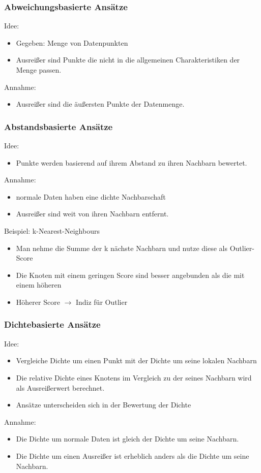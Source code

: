 \documentclass{article} %
\begin{document}
\subsubsection{Abweichungsbasierte Ansätze}
Idee:
\begin{itemize}
	\item Gegeben: Menge von Datenpunkten
    \item Ausreißer sind Punkte die nicht in die allgemeinen Charakteristiken der Menge passen.
\end{itemize}
Annahme:
\begin{itemize}
	\item Ausreißer sind die äußersten Punkte der Datenmenge.
\end{itemize}
\subsubsection{Abstandsbasierte Ansätze}
Idee:
\begin{itemize}
	\item Punkte werden basierend auf ihrem Abstand zu ihren Nachbarn bewertet. 
\end{itemize}
Annahme:
\begin{itemize}
	\item normale Daten haben eine dichte Nachbarschaft
    \item Ausreißer sind weit von ihren Nachbarn entfernt.
\end{itemize}
Beispiel: k-Nearest-Neighbours
	\begin{itemize}
	\item Man nehme die Summe der k nächste Nachbarn und nutze diese als Outlier-Score
	\item Die Knoten mit einem geringen Score sind besser angebunden als die mit einem höheren
	\item Höherer Score $\rightarrow$ Indiz für Outlier
	\end{itemize}
\subsubsection{Dichtebasierte Ansätze}
Idee:
\begin{itemize}
	\item Vergleiche Dichte um einen Punkt mit der Dichte um seine lokalen Nachbarn
    \item Die relative Dichte eines Knotens im Vergleich zu der seines Nachbarn wird als Ausreißerwert berechnet.
    \item Ansätze unterscheiden sich in der Bewertung der Dichte
\end{itemize}
Annahme:
\begin{itemize}
	\item Die Dichte um normale Daten ist gleich der Dichte um seine Nachbarn.
    \item Die Dichte um einen Ausreißer ist erheblich anders als die Dichte um seine Nachbarn.
\end{itemize}
\end{document}

